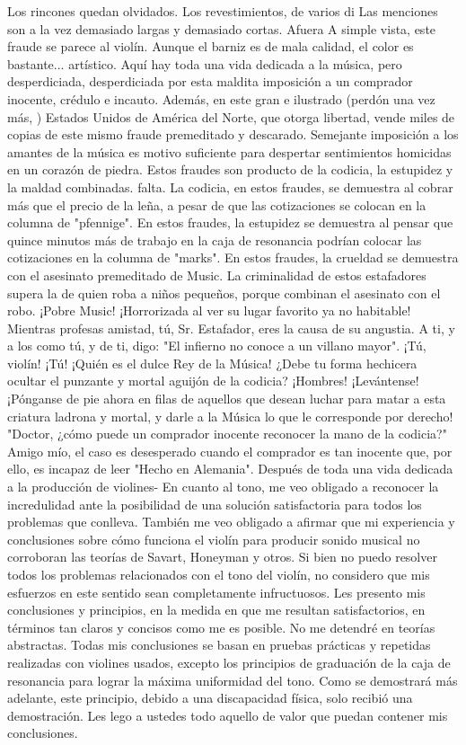 Los rincones quedan olvidados.	Los revestimientos, de varios di
Las menciones son a la vez demasiado largas y demasiado cortas.	Afuera
A simple vista, este fraude se parece al violín. Aunque el barniz es de mala calidad, el color es bastante...
artístico.
Aquí hay toda una vida dedicada a la música, pero desperdiciada, desperdiciada por esta maldita imposición a un comprador inocente, crédulo e incauto. Además, en este gran e ilustrado (perdón una vez más, )
Estados Unidos de América del Norte, que otorga libertad, vende miles de copias de este mismo fraude premeditado y descarado. Semejante imposición a los amantes de la música es motivo suficiente para despertar sentimientos homicidas en un corazón de piedra. Estos fraudes son producto de la codicia, la estupidez y la maldad combinadas.
falta. La codicia, en estos fraudes, se demuestra al cobrar más que el precio de la leña, a pesar de que las cotizaciones se colocan en la columna de "pfennige". En estos fraudes, la estupidez se demuestra al pensar que quince minutos más de trabajo en la caja de resonancia podrían colocar las cotizaciones en la columna de "marks". En estos fraudes, la crueldad se demuestra con el asesinato premeditado de Music. La criminalidad de estos estafadores supera la de quien roba a niños pequeños, porque combinan el asesinato con el robo. ¡Pobre Music! ¡Horrorizada al ver su lugar favorito ya no habitable! Mientras profesas amistad, tú, Sr. Estafador, eres la causa de su angustia. A ti, y a los como tú, y de ti, digo: "El infierno no conoce a un villano mayor".
¡Tú, violín! ¡Tú!
¡Quién es el dulce Rey de la Música!
¿Debe tu forma hechicera ocultar el punzante y mortal aguijón de la codicia? ¡Hombres! ¡Levántense! ¡Pónganse de pie ahora en filas de aquellos que desean luchar para matar a esta criatura ladrona y mortal, y darle a la Música lo que le corresponde por derecho!
"Doctor, ¿cómo puede un comprador inocente reconocer la mano de la codicia?"
Amigo mío, el caso es desesperado cuando el comprador es tan inocente que, por ello, es incapaz de leer "Hecho en Alemania".
Después de toda una vida dedicada a la producción de violines-
En cuanto al tono, me veo obligado a reconocer la incredulidad ante la posibilidad de una solución satisfactoria para todos los problemas que conlleva. También me veo obligado a afirmar que mi experiencia y conclusiones sobre cómo funciona el violín para producir sonido musical no corroboran las teorías de Savart, Honeyman y otros. Si bien no puedo resolver todos los problemas relacionados con el tono del violín, no considero que mis esfuerzos en este sentido sean completamente infructuosos. Les presento mis conclusiones y principios, en la medida en que me resultan satisfactorios, en términos tan claros y concisos como me es posible. No me detendré en teorías abstractas. Todas mis conclusiones se basan en pruebas prácticas y repetidas realizadas con violines usados, excepto los principios de graduación de la caja de resonancia para lograr la máxima uniformidad del tono. Como se demostrará más adelante, este principio, debido a una discapacidad física, solo recibió una demostración. Les lego a ustedes todo aquello de valor que puedan contener mis conclusiones.

